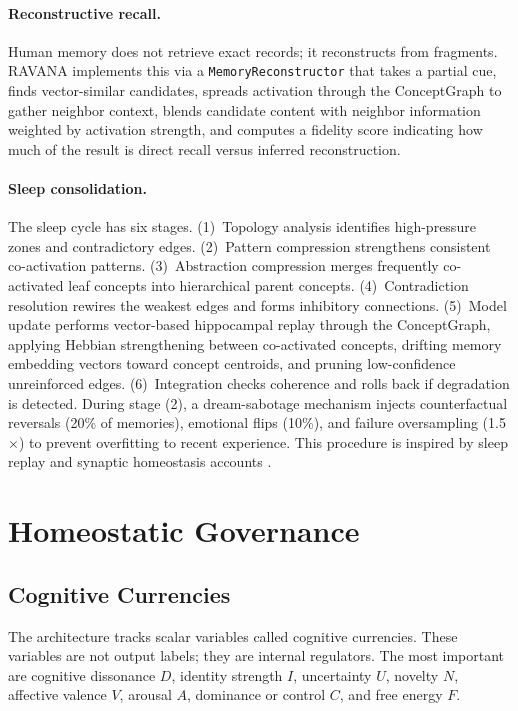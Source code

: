 \documentclass[11pt]{article}
\begin{document}
\paragraph{Reconstructive recall.}
Human memory does not retrieve exact records; it reconstructs from fragments. RAVANA implements this via a \texttt{MemoryReconstructor} that takes a partial cue, finds vector-similar candidates, spreads activation through the ConceptGraph to gather neighbor context, blends candidate content with neighbor information weighted by activation strength, and computes a fidelity score indicating how much of the result is direct recall versus inferred reconstruction.

\paragraph{Sleep consolidation.}
The sleep cycle has six stages. (1)~Topology analysis identifies high-pressure zones and contradictory edges. (2)~Pattern compression strengthens consistent co-activation patterns. (3)~Abstraction compression merges frequently co-activated leaf concepts into hierarchical parent concepts. (4)~Contradiction resolution rewires the weakest edges and forms inhibitory connections. (5)~Model update performs vector-based hippocampal replay through the ConceptGraph, applying Hebbian strengthening between co-activated concepts, drifting memory embedding vectors toward concept centroids, and pruning low-confidence unreinforced edges. (6)~Integration checks coherence and rolls back if degradation is detected. During stage (2), a dream-sabotage mechanism injects counterfactual reversals (20\% of memories), emotional flips (10\%), and failure oversampling (1.5$\times$) to prevent overfitting to recent experience. This procedure is inspired by sleep replay and synaptic homeostasis accounts \cite{tononi2006,walker2006,diekelmann2010,wilson1994,ji2007}.

\section{Homeostatic Governance}
\subsection{Cognitive Currencies}
The architecture tracks scalar variables called cognitive currencies. These variables are not output labels; they are internal regulators. The most important are cognitive dissonance $D$, identity strength $I$, uncertainty $U$, novelty $N$, affective valence $V$, arousal $A$, dominance or control $C$, and free energy $F$.
\end{document}
